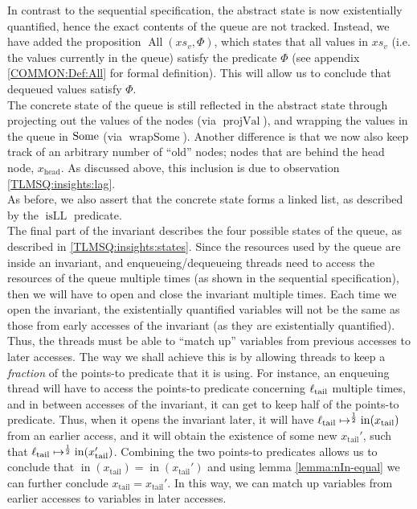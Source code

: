 \documentclass[a4paper, 10pt]{report}
\theoremstyle{definition}
\newcommand{\isLL}{\operatorname{isLL}}
\newcommand{\AllP}{\operatorname{All}}
\newcommand{\projval}{\operatorname{projVal}}
\newcommand{\wrapsome}{\operatorname{wrapSome}}
\newcommand{\locN}[1]{\loc_{\mathrm{#1}}}
\newcommand{\loctail}{\locN{tail}}
\newcommand{\nIn}[1]{\operatorname{in}(#1)}
\newcommand{\node}{x}
\newcommand{\nodeN}[1]{\node_{\mathrm{#1}}}
\newcommand{\nodehead}{\nodeN{head}}
\newcommand{\nodetail}{\nodeN{tail}}
\newcommand{\absvalueList}{xs_v}
\begin{document}
In contrast to the sequential specification, the abstract state is now existentially quantified, hence the exact contents of the queue are not tracked. Instead, we have added the proposition $\AllP(\absvalueList, \Phi)$, which states that all values in $\absvalueList$ (i.e. the values currently in the queue) satisfy the predicate $\Phi$ (see appendix \ref{COMMON:Def:All} for formal definition). This will allow us to conclude that dequeued values satisfy $\Phi$.\\
The concrete state of the queue is still reflected in the abstract state through projecting out the values of the nodes (via $\projval$), and wrapping the values in the queue in $\operatorname{Some}$ (via $\wrapsome$). Another difference is that we now also keep track of an arbitrary number of ``old'' nodes; nodes that are behind the head node, $\nodehead$. As discussed above, this inclusion is due to observation \ref{TLMSQ:insights:lag}.\\
As before, we also assert that the concrete state forms a linked list, as described by the $\isLL$ predicate.\\
The final part of the invariant describes the four possible states of the queue, as described in \ref{TLMSQ:insights:states}. Since the resources used by the queue are inside an invariant, and enqueueing/dequeueing threads need to access the resources of the queue multiple times (as shown in the sequential specification), then we will have to open and close the invariant multiple times. Each time we open the invariant, the existentially quantified variables will not be the same as those from early accesses of the invariant (as they are existentially quantified). Thus, the threads must be able to ``match up'' variables from previous accesses to later accesses. The way we shall achieve this is by allowing threads to keep a \textit{fraction} of the points-to predicate that it is using. For instance, an enqueuing thread will have to access the points-to predicate concerning $\loctail$ multiple times, and in between accesses of the invariant, it can get to keep half of the points-to predicate. Thus, when it opens the invariant later, it will have $\loctail \mapsto^{\frac{1}{2}} \nIn{\nodetail}$ from an earlier access, and it will obtain the existence of some new $\nodetail'$, such that $\loctail \mapsto^{\frac{1}{2}} \nIn{\nodetail'}$. Combining the two points-to predicates allows us to conclude that $\nIn{\nodetail} = \nIn{\nodetail'}$ and using lemma \ref{lemma:nIn-equal} we can further conclude $\nodetail = \nodetail'$. In this way, we can match up variables from earlier accesses to variables in later accesses.\\
\end{document}
